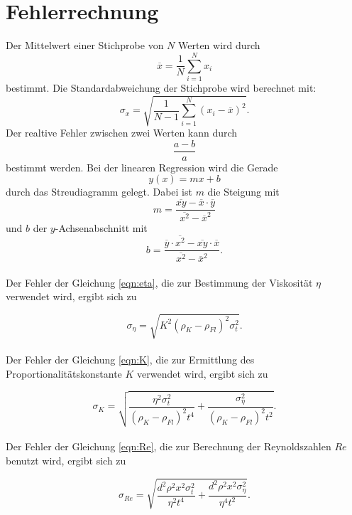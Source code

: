 \section{Fehlerrechnung}

Der Mittelwert einer Stichprobe von $N$ Werten wird durch
\begin{equation}
    \overline{x} = \frac{1}{N} \sum_{i=1}^N x_i
    \label{eqn:mittelwert}
\end{equation}
bestimmt.
\newline
Die Standardabweichung der Stichprobe wird berechnet mit:
\begin{equation}
    \sigma_x = \sqrt{\frac{1}{N-1} \sum_{i=1}^N (x_i - \overline{x})^2}.
    \label{eqn:standard}
\end{equation}
\newline
Der realtive Fehler zwischen zwei Werten kann durch
\begin{equation*}
    \frac{a-b}{a}
\end{equation*}
bestimmt werden.
\newline
Bei der linearen Regression wird die Gerade
\begin{equation*}
    y(x) = mx + b
\end{equation*}
durch das Streudiagramm gelegt.
Dabei ist $m$ die Steigung mit
\begin{equation*}
    m = \frac{\overline{xy} - \overline{x} \cdot \overline{y}}{\overline{x^2} - \overline{x}^2}
\end{equation*}
und $b$ der $y$-Achsenabschnitt mit
\begin{equation*}
    b = \frac{\overline{y} \cdot \overline{x^2} - \overline{xy} \cdot \overline{x}}{\overline{x^2} - \overline{x}^2}.
\end{equation*}
\\

\noindent Der Fehler der Gleichung \ref{eqn:eta}, die zur Bestimmung der Viskosität $\eta$ verwendet wird, ergibt sich zu 

\begin{equation}
    \sigma_{\eta} = \sqrt{K^{2} \left(\rho_{K}-\rho_{Fl}\right)^{2} \sigma_{t}^{2}}.
    \label{eqn:erreta}
\end{equation}
\\
\noindent Der Fehler der Gleichung \ref{eqn:K}, die zur Ermittlung des Proportionalitätskonstante $K$ verwendet wird, ergibt sich zu 

\begin{equation}
    \sigma_{K} = \sqrt{\frac{\eta^{2} \sigma_{t}^{2}}{\left(\rho_{K}-\rho_{Fl}\right)^{2} t^{4}} + \frac{\sigma_{\eta}^{2}}{\left(\rho_{K}-\rho_{Fl}\right)^{2}t^{2}}}.
    \label{eqn:errK}
\end{equation}
\\
\noindent Der Fehler der Gleichung \ref{eqn:Re}, die zur Berechnung der Reynoldszahlen $Re$ benutzt wird, ergibt sich zu 

\begin{equation}
    \sigma_{Re} = \sqrt{\frac{d^{2} \rho^{2} x^{2} \sigma_{t}^{2} }{\eta^{2} t^{4}} + \frac{d^{2} \rho^{2} x^{2} \sigma_{\eta}^{2}}{\eta^{4} t^{2}}}.
    \label{eqn:errRe}
\end{equation}
